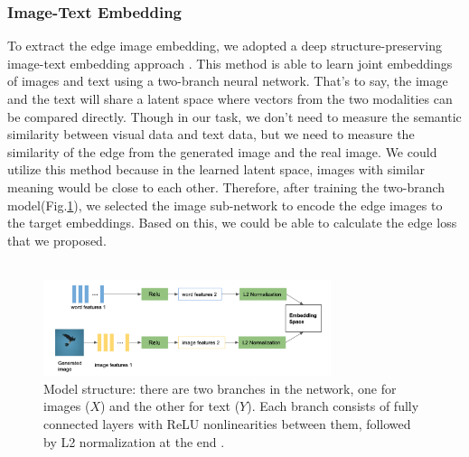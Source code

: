 \documentclass[10pt,twocolumn,letterpaper]{article}
\begin{document}
\subsubsection{Image-Text Embedding}
To extract the edge image embedding, we adopted a deep structure-preserving image-text embedding approach \cite{wang2016learning}. This method is able to learn joint embeddings of images and text using a two-branch neural network. That’s to say, the image and the text will share a latent space where vectors from the two modalities can be compared directly. Though in our task, we don’t need to measure the semantic similarity between visual data and text data, but we need to measure the similarity of the edge from the generated image and the real image. We could utilize this method because in the learned latent space, images with similar meaning would be close to each other. Therefore, after training the two-branch model(Fig.\ref{embeddingmodel}), we selected the image sub-network to encode the edge images to the target embeddings. Based on this, we could be able to calculate the edge loss that we proposed. 
\\\\
\begin{figure}[htp]
    \centering
    \includegraphics[width=0.75\textwidth]{ebd.png}
    \caption{Model structure: there are two branches in the network, one for images ($X$) and the other for text ($Y$). Each branch consists of fully connected layers with ReLU nonlinearities between them, followed by L2 normalization at the end \cite{wang2016learning}.}
    \label{embeddingmodel}
\end{figure}
\end{document}
